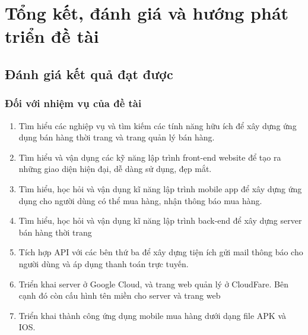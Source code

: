 \section{Tổng kết, đánh giá và hướng phát triển đề tài}
\subsection{Đánh giá kết quả đạt được}
\subsubsection{Đối với nhiệm vụ của đề tài}
\begin{enumerate}[-]
    \item Tìm hiểu các nghiệp vụ và tìm kiếm các tính năng hữu ích để xây dựng ứng dụng bán hàng thời trang và trang quản lý bán hàng.
    \item Tìm hiểu và vận dụng các kỹ năng lập trình front-end website để tạo ra những giao diện hiện đại, dễ dàng sử dụng, đẹp mắt.
    \item Tìm hiểu, học hỏi và vận dụng kĩ năng lập trình mobile app để xây dựng ứng dụng cho người dùng có thể mua hàng, nhận thông báo mua hàng.
    \item Tìm hiểu, học hỏi và vận dụng kĩ năng lập trình back-end để xây dựng server bán hàng thời trang
    \item Tích hợp API với các bên thứ ba để xây dựng tiện ích gửi mail thông báo cho người dùng và áp dụng thanh toán trực tuyến.
    \item Triển khai server ở Google Cloud, và trang web quản lý ở CloudFare. Bên cạnh đó còn cấu hình tên miền cho server và trang web
    \item Triển khai thành công ứng dụng mobile mua hàng dưới dạng file APK và IOS.
\end{enumerate}
